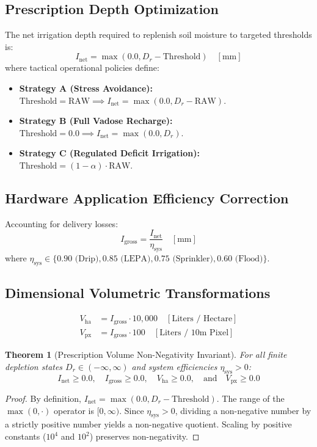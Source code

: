 \documentclass[11pt,a4paper]{article}
\newtheorem{theorem}{Theorem}[section]
\theoremstyle{definition}
\theoremstyle{remark}
\begin{document}
\subsection{Prescription Depth Optimization}
The net irrigation depth required to replenish soil moisture to targeted thresholds is:
\begin{equation}
    I_{\text{net}} = \max\left(0.0, D_r - \text{Threshold}\right) \quad [\text{mm}]
\end{equation}
where tactical operational policies define:
\begin{itemize}
    \item \textbf{Strategy A (Stress Avoidance):} $\text{Threshold} = \text{RAW} \implies I_{\text{net}} = \max(0.0, D_r - \text{RAW})$.
    \item \textbf{Strategy B (Full Vadose Recharge):} $\text{Threshold} = 0.0 \implies I_{\text{net}} = \max(0.0, D_r)$.
    \item \textbf{Strategy C (Regulated Deficit Irrigation):} $\text{Threshold} = (1 - \alpha) \cdot \text{RAW}$.
\end{itemize}

\subsection{Hardware Application Efficiency Correction}
Accounting for delivery losses:
\begin{equation}
    I_{\text{gross}} = \frac{I_{\text{net}}}{\eta_{\text{sys}}} \quad [\text{mm}]
\end{equation}
where $\eta_{\text{sys}} \in \{0.90 \text{ (Drip)}, 0.85 \text{ (LEPA)}, 0.75 \text{ (Sprinkler)}, 0.60 \text{ (Flood)}\}$.

\subsection{Dimensional Volumetric Transformations}
\begin{align}
    V_{\text{ha}} &= I_{\text{gross}} \cdot 10,000 \quad [\text{Liters / Hectare}] \\
    V_{\text{px}} &= I_{\text{gross}} \cdot 100 \quad [\text{Liters / } 10\text{m Pixel}]
\end{align}

\begin{theorem}[Prescription Volume Non-Negativity Invariant]
For all finite depletion states $D_r \in (-\infty, \infty)$ and system efficiencies $\eta_{\text{sys}} > 0$:
\begin{equation}
    I_{\text{net}} \ge 0.0, \quad I_{\text{gross}} \ge 0.0, \quad V_{\text{ha}} \ge 0.0, \quad \text{and} \quad V_{\text{px}} \ge 0.0
\end{equation}
\end{theorem}
\begin{proof}
By definition, $I_{\text{net}} = \max(0.0, D_r - \text{Threshold})$. The range of the $\max(0, \cdot)$ operator is $[0, \infty)$. Since $\eta_{\text{sys}} > 0$, dividing a non-negative number by a strictly positive number yields a non-negative quotient. Scaling by positive constants ($10^4$ and $10^2$) preserves non-negativity.
\end{proof}
\end{document}
